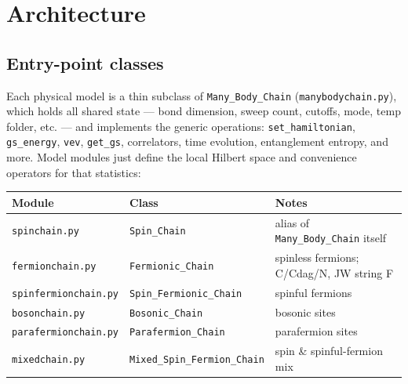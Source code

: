 \documentclass[11pt]{article}
\begin{document}
\section{Architecture}

\subsection{Entry-point classes}

Each physical model is a thin subclass of \texttt{Many\_Body\_Chain}
(\texttt{manybodychain.py}), which holds all shared state --- bond
dimension, sweep count, cutoffs, mode, temp folder, etc. --- and
implements the generic operations: \texttt{set\_hamiltonian},
\texttt{gs\_energy}, \texttt{vev}, \texttt{get\_gs}, correlators, time
evolution, entanglement entropy, and more. Model modules just define the
local Hilbert space and convenience operators for that statistics:

\begin{center}
\footnotesize
\begin{tabular}{lll}
\toprule
Module & Class & Notes \\
\midrule
\texttt{spinchain.py} & \texttt{Spin\_Chain} & alias of \texttt{Many\_Body\_Chain} itself \\
\texttt{fermionchain.py} & \texttt{Fermionic\_Chain} & spinless fermions; C/Cdag/N, JW string F \\
\texttt{spinfermionchain.py} & \texttt{Spin\_Fermionic\_Chain} & spinful fermions \\
\texttt{bosonchain.py} & \texttt{Bosonic\_Chain} & bosonic sites \\
\texttt{parafermionchain.py} & \texttt{Parafermion\_Chain} & parafermion sites \\
\texttt{mixedchain.py} & \texttt{Mixed\_Spin\_\allowbreak Fermion\_Chain} & spin \& spinful-fermion mix \\
\bottomrule
\end{tabular}
\normalsize
\end{center}
\end{document}
